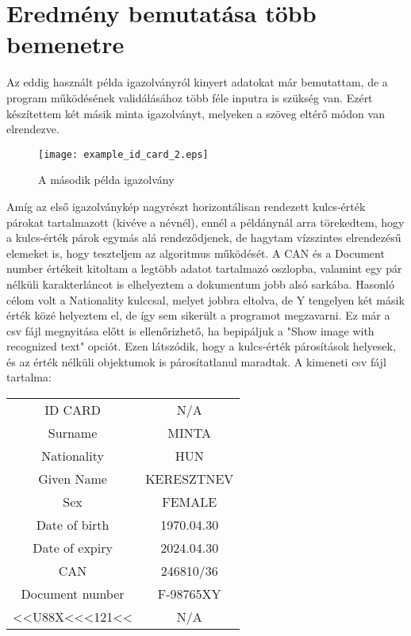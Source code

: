 \documentclass[12pt]{report}
\begin{document}
\section{Eredmény bemutatása több bemenetre}

Az eddig használt példa igazolványról kinyert adatokat már bemutattam, de a program működésének validálásához több féle inputra is szükség van. Ezért készítettem két másik minta igazolványt, melyeken a szöveg eltérő módon van elrendezve.

\newpage

\begin{figure}[h]
    \centerline{\texttt{[image: example\_id\_card\_2.eps]}}
    \caption{A második példa igazolvány}
\end{figure}

Amíg az első igazolványkép nagyrészt horizontálisan rendezett kulcs-érték párokat tartalmazott (kivéve a névnél), ennél a példánynál arra törekedtem, hogy a kulcs-érték párok egymás alá rendeződjenek, de hagytam vízszintes elrendezésű elemeket is, hogy teszteljem az algoritmus működését.
A CAN és a Document number értékeit kitoltam a legtöbb adatot tartalmazó oszlopba, valamint egy pár nélküli karakterláncot is elhelyeztem a dokumentum jobb alsó sarkába. Hasonló célom volt a Nationality kulccsal, melyet jobbra eltolva, de Y tengelyen két másik érték közé helyeztem el, de így sem sikerült a programot megzavarni. Ez már a csv fájl megnyitása előtt is ellenőrizhető, ha bepipáljuk a "Show image with recognized text" opciót. Ezen látszódik, hogy a kulcs-érték párosítások helyesek, és az érték nélküli objektumok is párosítatlanul maradtak. A kimeneti csv fájl tartalma:

\begin{tcolorbox}
    \begin{center}
        \begin{tabular}{ c c }
            ID CARD & N/A \\ 
            Surname & MINTA \\
            Nationality & HUN \\
            Given Name & KERESZTNEV \\
            Sex & FEMALE \\
            Date of birth & 1970.04.30 \\
            Date of expiry & 2024.04.30 \\
            CAN & 246810/36 \\
            Document number & F-98765XY \\
            <<U88X<<<121<< & N/A \\
        \end{tabular}
    \end{center}
\end{tcolorbox}
\end{document}

